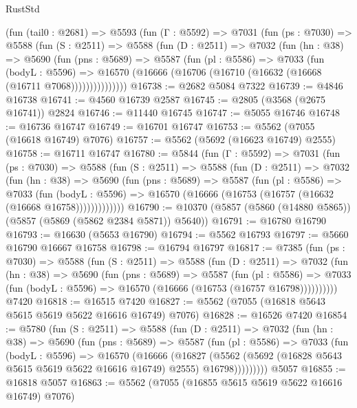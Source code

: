 \begin{lexlean}{RustStd}
\begin{coremodule}
    (fun (tail0 : @2681) =>
    @5593
      (fun (Γ : @5592) =>
      @7031
        (fun (ps : @7030) =>
        @5588
          (fun (S : @2511) =>
          @5588
            (fun (D : @2511) =>
            @7032
              (fun (hn : @38) =>
              @5690
                (fun (pns : @5689) =>
                @5587
                  (fun (pl : @5586) =>
                  @7033
                    (fun (bodyL : @5596) =>
                    @16570 (@16666 (@16706 (@16710 (@16632 (@16668 (@16711 @7068)))))))))))))))
@16738 := @2682 @5084 @7322
@16739 := @4846 @16738
@16741 := @4560 @16739 @2587
@16745 := @2805 (@3568 (@2675 @16741)) @2824
@16746 := @11440 @16745
@16747 := @5055 @16746
@16748 := @16736 @16747
@16749 := @16701 @16747
@16753 := @5562 (@7055 (@16618 @16749) @7076)
@16757 := @5562 (@5692 (@16623 @16749) @2555)
@16758 := @16711 @16747
@16780 := @5844
    (fun (Γ : @5592) =>
    @7031
      (fun (ps : @7030) =>
      @5588
        (fun (S : @2511) =>
        @5588
          (fun (D : @2511) =>
          @7032
            (fun (hn : @38) =>
            @5690
              (fun (pns : @5689) =>
              @5587
                (fun (pl : @5586) =>
                @7033
                  (fun (bodyL : @5596) =>
                  @16570 (@16666 (@16753 (@16757 (@16632 (@16668 @16758)))))))))))))
@16790 := @10370 (@5857 (@5860 (@14880 @5865)) (@5857 (@5869 (@5862 @2384 @5871)) @5640))
@16791 := @16780 @16790
@16793 := @16630 (@5653 @16790)
@16794 := @5562 @16793
@16797 := @5660 @16790 @16667 @16758
@16798 := @16794 @16797
@16817 := @7385
    (fun (ps : @7030) =>
    @5588
      (fun (S : @2511) =>
      @5588
        (fun (D : @2511) =>
        @7032
          (fun (hn : @38) =>
          @5690
            (fun (pns : @5689) =>
            @5587
              (fun (pl : @5586) =>
              @7033 (fun (bodyL : @5596) => @16570 (@16666 (@16753 (@16757 @16798))))))))))
    @7420
@16818 := @16515 @7420
@16827 := @5562 (@7055 (@16818 @5643 @5615 @5619 @5622 @16616 @16749) @7076)
@16828 := @16526 @7420
@16854 := @5780
    (fun (S : @2511) =>
    @5588
      (fun (D : @2511) =>
      @7032
        (fun (hn : @38) =>
        @5690
          (fun (pns : @5689) =>
          @5587
            (fun (pl : @5586) =>
            @7033
              (fun (bodyL : @5596) =>
              @16570
                (@16666
                  (@16827
                    (@5562
                      (@5692 (@16828 @5643 @5615 @5619 @5622 @16616 @16749) @2555)
                      @16798)))))))))
    @5057
@16855 := @16818 @5057
@16863 := @5562 (@7055 (@16855 @5615 @5619 @5622 @16616 @16749) @7076)

\end{coremodule}
\end{lexlean}
